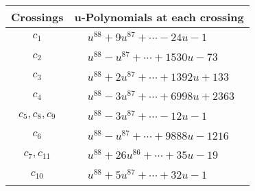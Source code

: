 \documentclass[1p]{elsarticle_modified}
\theoremstyle{definition}
\begin{document}
\begin{tabular}{m{50pt}|m{274pt}}
Crossings & \hspace{64pt}u-Polynomials at each crossing \\
\hline $$\begin{aligned}c_{1}\end{aligned}$$&$\begin{aligned}
&u^{88}+9 u^{87}+\cdots-24 u-1
\end{aligned}$\\
\hline $$\begin{aligned}c_{2}\end{aligned}$$&$\begin{aligned}
&u^{88}- u^{87}+\cdots+1530 u-73
\end{aligned}$\\
\hline $$\begin{aligned}c_{3}\end{aligned}$$&$\begin{aligned}
&u^{88}+2 u^{87}+\cdots+1392 u+133
\end{aligned}$\\
\hline $$\begin{aligned}c_{4}\end{aligned}$$&$\begin{aligned}
&u^{88}-3 u^{87}+\cdots+6998 u+2363
\end{aligned}$\\
\hline $$\begin{aligned}c_{5},c_{8},c_{9}\end{aligned}$$&$\begin{aligned}
&u^{88}-3 u^{87}+\cdots-12 u-1
\end{aligned}$\\
\hline $$\begin{aligned}c_{6}\end{aligned}$$&$\begin{aligned}
&u^{88}- u^{87}+\cdots+9888 u-1216
\end{aligned}$\\
\hline $$\begin{aligned}c_{7},c_{11}\end{aligned}$$&$\begin{aligned}
&u^{88}+26 u^{86}+\cdots+35 u-19
\end{aligned}$\\
\hline $$\begin{aligned}c_{10}\end{aligned}$$&$\begin{aligned}
&u^{88}+5 u^{87}+\cdots+32 u-1
\end{aligned}$\\
\hline
\end{tabular}\\~\\
\end{document}
